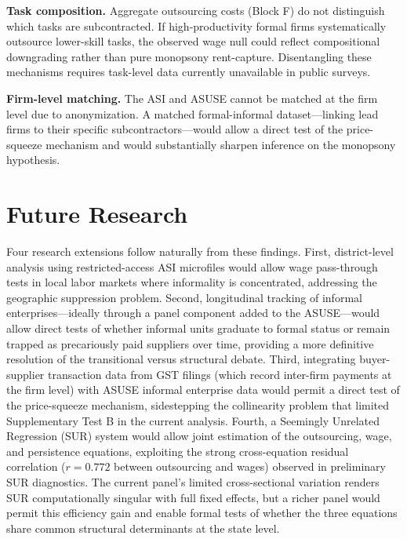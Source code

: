 \textbf{Task composition.} Aggregate outsourcing costs (Block F) do not distinguish which tasks are subcontracted. If high-productivity formal firms systematically outsource lower-skill tasks, the observed wage null could reflect compositional downgrading rather than pure monopsony rent-capture. Disentangling these mechanisms requires task-level data currently unavailable in public surveys.

\textbf{Firm-level matching.} The ASI and ASUSE cannot be matched at the firm level due to anonymization. A matched formal-informal dataset—linking lead firms to their specific subcontractors—would allow a direct test of the price-squeeze mechanism and would substantially sharpen inference on the monopsony hypothesis.

\section{Future Research}
\label{sec:future}

Four research extensions follow naturally from these findings. First, district-level analysis using restricted-access ASI microfiles would allow wage pass-through tests in local labor markets where informality is concentrated, addressing the geographic suppression problem. Second, longitudinal tracking of informal enterprises---ideally through a panel component added to the ASUSE---would allow direct tests of whether informal units graduate to formal status or remain trapped as precariously paid suppliers over time, providing a more definitive resolution of the transitional versus structural debate. Third, integrating buyer-supplier transaction data from GST filings (which record inter-firm payments at the firm level) with ASUSE informal enterprise data would permit a direct test of the price-squeeze mechanism, sidestepping the collinearity problem that limited Supplementary Test B in the current analysis. Fourth, a Seemingly Unrelated Regression (SUR) system would allow joint estimation of the outsourcing, wage, and persistence equations, exploiting the strong cross-equation residual correlation ($r = 0.772$ between outsourcing and wages) observed in preliminary SUR diagnostics. The current panel's limited cross-sectional variation renders SUR computationally singular with full fixed effects, but a richer panel would permit this efficiency gain and enable formal tests of whether the three equations share common structural determinants at the state level.
